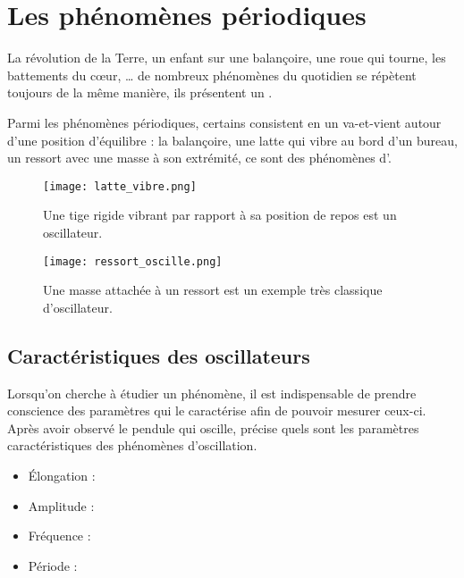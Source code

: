 \chapter{Les phénomènes périodiques}
La révolution de la Terre, un enfant sur une balançoire, une roue qui tourne, les battements du cœur, … de nombreux phénomènes du quotidien se répètent toujours de la même manière, ils présentent un .

Parmi les phénomènes périodiques, certains consistent en un va-et-vient autour d'une position d'équilibre : la balançoire, une latte qui vibre au bord d'un bureau, un ressort avec une masse à son extrémité, ce sont des phénomènes d'.
\begin{figure}[h!]
    \begin{minipage}{.5\textwidth}
        \centering
        \texttt{[image: latte\_vibre.png]}
        \caption{Une tige rigide vibrant par rapport à sa position de repos est un oscillateur.}
        \label{lame_vibre}
    \end{minipage}
    \begin{minipage}{.5\textwidth}
        \centering
        \texttt{[image: ressort\_oscille.png]}
        \caption{Une masse attachée à un ressort est un exemple très classique d'oscillateur.}
        \label{lame_vibre}
    \end{minipage}
\end{figure}

\newpage

\section{Caractéristiques des oscillateurs}
Lorsqu'on cherche à étudier un phénomène, il est indispensable de prendre conscience des paramètres qui le caractérise afin de pouvoir mesurer ceux-ci.
Après avoir observé le pendule qui oscille, précise quels sont les paramètres caractéristiques des phénomènes d'oscillation.
\begin{itemize}[label=\textbullet]
    \item Élongation : \dotfill
    \item Amplitude : \dotfill
    \item Fréquence : \dotfill
    \item Période : \dotfill
\end{itemize}

